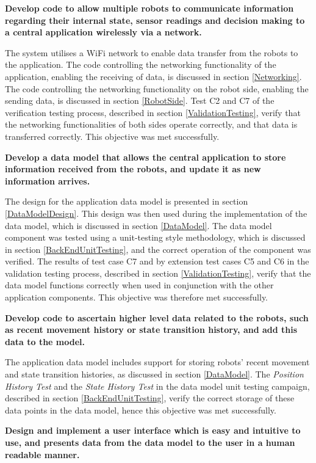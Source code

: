 \noindent \textbf{Develop code to allow multiple robots to communicate information regarding their internal state, sensor readings and decision making to a central application wirelessly via a network.}

The system utilises a WiFi network to enable data transfer from the robots to the application. The code controlling the networking functionality of the application, enabling the receiving of data, is discussed in section \ref{Networking}. The code controlling the networking functionality on the robot side, enabling the sending data, is discussed in section \ref{RobotSide}. Test C2 and C7 of the verification testing process, described in section \ref{ValidationTesting}, verify that the networking functionalities of both sides operate correctly, and that data is transferred correctly. This objective was met successfully.

\noindent \textbf{Develop a data model that allows the central application to store information received from the robots, and update it as new information arrives.}

The design for the application data model is presented in section \ref{DataModelDesign}. This design was then used during the implementation of the data model, which is discussed in section \ref{DataModel}. The data model component was tested using a unit-testing style methodology, which is discussed in section \ref{BackEndUnitTesting}, and the correct operation of the component was verified. The results of test case C7 and by extension test cases C5 and C6 in the validation testing process, described in section \ref{ValidationTesting}, verify that the data model functions correctly when used in conjunction with the other application components. This objective was therefore met successfully.

\noindent \textbf{Develop code to ascertain higher level data related to the robots, such as recent movement history or state transition history, and add this data to the model.}

The application data model includes support for storing robots' recent movement and state transition histories, as discussed in section \ref{DataModel}. The \textit{Position History Test} and the \textit{State History Test} in the data model unit testing campaign, described in section \ref{BackEndUnitTesting}, verify the correct storage of these data points in the data model, hence this objective was met successfully.

\noindent \textbf{Design and implement a user interface which is easy and intuitive to use, and presents data from the data model to the user in a human readable manner.}

